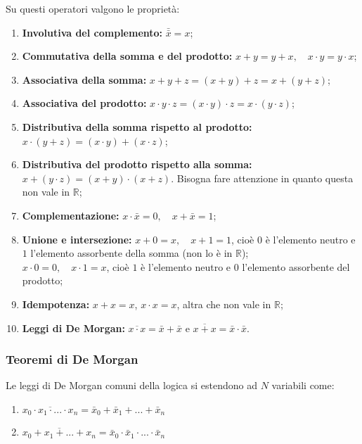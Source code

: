 \documentclass[a4paper,11pt]{article}
\begin{document}
\par\smallskip

Su questi operatori valgono le proprietà:
\begin{enumerate}
	\item \textbf{Involutiva del complemento:} $\bar{\bar{x}} = x$;
	\item \textbf{Commutativa della somma e del prodotto:} $ x + y = y + x, \quad x \cdot y = y \cdot x$;
	\item \textbf{Associativa della somma:} $ x + y + z = (x + y) + z = x + (y + z)$;
	\item \textbf{Associativa del prodotto:} $ x \cdot y \cdot z = (x \cdot y) \cdot z = x \cdot (y \cdot z)$;
	\item \textbf{Distributiva della somma rispetto al prodotto:} $ x \cdot (y + z) = (x \cdot y) + (x \cdot z) $;
	\item \textbf{Distributiva del prodotto rispetto alla somma:} $ x + (y \cdot z) = (x + y) \cdot (x + z) $. Bisogna fare attenzione in quanto questa non vale in $\mathbb{R}$;
	\item \textbf{Complementazione:} $ x \cdot \bar{x} = 0, \quad x + \bar{x} = 1 $;
	\item \textbf{Unione e intersezione:} $ x + 0 = x, \quad x + 1 = 1 $, cioè $0$ è l'elemento neutro e $1$ l'elemento assorbente della somma (non lo è in $\mathbb{R}$); \\
																				$ x \cdot 0 = 0, \quad x \cdot 1 = x $, cioè $1$ è l'elemento neutro e $0$ l'elemento assorbente del prodotto;
	\item \textbf{Idempotenza:} $x + x = x$, \quad $x \cdot x = x$, altra che non vale in $\mathbb{R}$;
	\item \textbf{Leggi di De Morgan:} $\overline{x \cdot x} = \bar{x} + \bar{x}$ e $\overline{x + x} = \bar{x} \cdot \bar{x}$.
\end{enumerate}

\subsubsection{Teoremi di De Morgan}
Le leggi di De Morgan comuni della logica si estendono ad $N$ variabili come:
\begin{enumerate}
	\item $\overline{x_0 \cdot x_1 \cdot ... \cdot x_n} = \bar{x}_0 + \bar{x}_1 + ... + \bar{x}_n$
	\item $\overline{x_0 + x_1 + ... + x_{n}} = \bar{x}_0 \cdot \bar{x}_1 \cdot ... \cdot \bar{x}_n$
\end{enumerate}
\end{document}
